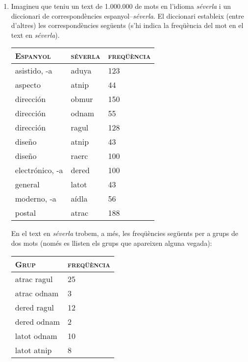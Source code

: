\begin{enumerate}
    \item Imagineu que teniu un text de 1.000.000 de mots en l'idioma
      \emph{séverla} i un diccionari de correspondències
      espanyol--\emph{séverla}. El diccionari estableix (entre
      d'altres) les correspondències següents (s'hi indica la
      freqüència del mot en el text en \emph{séverla}).
      \begin{center}
      \begin{tabular}{l|l|l}
      \hline\hline
      \textsc{Espanyol} & \textsc{séverla} & \textsc{freqüència} \\
      \hline
      \textsf{asistido, -a} & \textsf{aduya} & 123 \\
      \textsf{aspecto} & \textsf{atnip} & 44 \\ 
      \textsf{dirección} & \textsf{obmur} & 150  \\
      \textsf{dirección} & \textsf{odnam} & 55 \\
      \textsf{dirección} & \textsf{ragul} & 128 \\
      \textsf{diseño} & \textsf{atnip} & 43 \\
      \textsf{diseño} & \textsf{raerc} & 100 \\
      \textsf{electrónico, -a} & \textsf{dered} & 100 \\
      \textsf{general} & \textsf{latot}  & 43 \\
      \textsf{moderno, -a} & \textsf{aídla} & 56 \\
      \textsf{postal} & \textsf{atrac} & 188 \\
      \hline
      \end{tabular}
    \end{center}
    En el text en \emph{séverla} trobem, a més, les freqüències
    següents per a grups de dos mots (només es llisten els grups que
    apareixen alguna vegada):
      \begin{center}
        \begin{tabular}{l|l}  
        \hline\hline 
        \textsc{Grup} & \textsc{freqüència} \\\hline
        \textsf{atrac ragul} & 25 \\
        \textsf{atrac odnam} & 3 \\
        \textsf{dered ragul} & 12 \\
        \textsf{dered odnam} & 2 \\
        \textsf{latot odnam} & 10 \\
        \textsf{latot atnip} & 8 \\

\end{tabular}
\end{center}
\end{enumerate}

